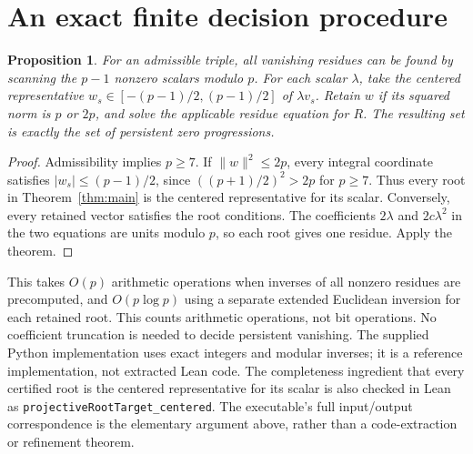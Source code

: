 \documentclass[11pt]{amsart}
\newcommand{\norm}[1]{\lVert#1\rVert}
\newcommand{\lean}[1]{{\small\nolinkurl{#1}}}
\newtheorem{proposition}[theorem]{Proposition}
\theoremstyle{definition}
\begin{document}
\section{An exact finite decision procedure}
\begin{proposition}\label{prop:scan}
For an admissible triple, all vanishing residues can be found by scanning
the $p-1$ nonzero scalars modulo $p$. For each scalar $\lambda$, take the
centered representative $w_s\in[-(p-1)/2,(p-1)/2]$ of $\lambda v_s$.
Retain $w$ if its squared norm is $p$ or $2p$, and solve the applicable
residue equation for $R$. The resulting set is exactly the set of
persistent zero progressions.
\end{proposition}
\begin{proof}
Admissibility implies $p\ge7$. If $\norm{w}^2\le2p$, every integral
coordinate satisfies $|w_s|\le(p-1)/2$, since
$((p+1)/2)^2>2p$ for $p\ge7$. Thus every root in
Theorem~\ref{thm:main} is the centered representative for its scalar.
Conversely, every retained vector satisfies the root conditions.
The coefficients $2\lambda$ and $2c\lambda^2$ in the two equations are
units modulo $p$, so each root gives one residue. Apply the theorem.
\end{proof}
This takes $O(p)$ arithmetic operations when inverses of all nonzero
residues are precomputed, and $O(p\log p)$ using a separate extended
Euclidean inversion for each retained root. This counts arithmetic
operations, not bit operations. No coefficient truncation is needed to
decide persistent vanishing. The supplied Python implementation uses
exact integers and modular inverses; it is a reference implementation,
not extracted Lean code. The completeness ingredient that every certified
root is the centered representative for its scalar is also checked in
Lean as \lean{projectiveRootTarget_centered}. The executable's full
input/output correspondence is the elementary argument above, rather than
a code-extraction or refinement theorem.
\end{document}
